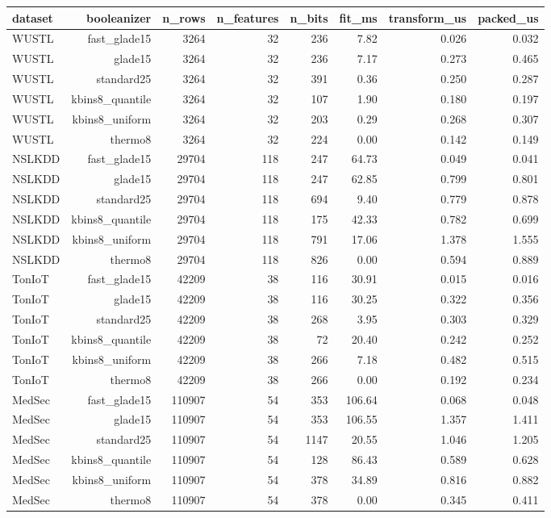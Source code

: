 \begin{tabular}{lrrrrrrr}
\toprule
dataset & booleanizer & n\_rows & n\_features & n\_bits & fit\_ms & transform\_us & packed\_us \\
\midrule
WUSTL & fast\_glade15 & 3264 & 32 & 236 & 7.82 & 0.026 & 0.032 \\
WUSTL & glade15 & 3264 & 32 & 236 & 7.17 & 0.273 & 0.465 \\
WUSTL & standard25 & 3264 & 32 & 391 & 0.36 & 0.250 & 0.287 \\
WUSTL & kbins8\_quantile & 3264 & 32 & 107 & 1.90 & 0.180 & 0.197 \\
WUSTL & kbins8\_uniform & 3264 & 32 & 203 & 0.29 & 0.268 & 0.307 \\
WUSTL & thermo8 & 3264 & 32 & 224 & 0.00 & 0.142 & 0.149 \\
NSLKDD & fast\_glade15 & 29704 & 118 & 247 & 64.73 & 0.049 & 0.041 \\
NSLKDD & glade15 & 29704 & 118 & 247 & 62.85 & 0.799 & 0.801 \\
NSLKDD & standard25 & 29704 & 118 & 694 & 9.40 & 0.779 & 0.878 \\
NSLKDD & kbins8\_quantile & 29704 & 118 & 175 & 42.33 & 0.782 & 0.699 \\
NSLKDD & kbins8\_uniform & 29704 & 118 & 791 & 17.06 & 1.378 & 1.555 \\
NSLKDD & thermo8 & 29704 & 118 & 826 & 0.00 & 0.594 & 0.889 \\
TonIoT & fast\_glade15 & 42209 & 38 & 116 & 30.91 & 0.015 & 0.016 \\
TonIoT & glade15 & 42209 & 38 & 116 & 30.25 & 0.322 & 0.356 \\
TonIoT & standard25 & 42209 & 38 & 268 & 3.95 & 0.303 & 0.329 \\
TonIoT & kbins8\_quantile & 42209 & 38 & 72 & 20.40 & 0.242 & 0.252 \\
TonIoT & kbins8\_uniform & 42209 & 38 & 266 & 7.18 & 0.482 & 0.515 \\
TonIoT & thermo8 & 42209 & 38 & 266 & 0.00 & 0.192 & 0.234 \\
MedSec & fast\_glade15 & 110907 & 54 & 353 & 106.64 & 0.068 & 0.048 \\
MedSec & glade15 & 110907 & 54 & 353 & 106.55 & 1.357 & 1.411 \\
MedSec & standard25 & 110907 & 54 & 1147 & 20.55 & 1.046 & 1.205 \\
MedSec & kbins8\_quantile & 110907 & 54 & 128 & 86.43 & 0.589 & 0.628 \\
MedSec & kbins8\_uniform & 110907 & 54 & 378 & 34.89 & 0.816 & 0.882 \\
MedSec & thermo8 & 110907 & 54 & 378 & 0.00 & 0.345 & 0.411 \\
\bottomrule
\end{tabular}
